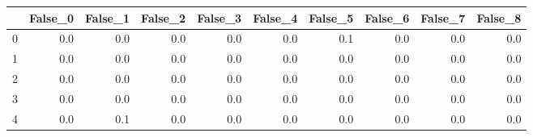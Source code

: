 \begin{tabular}{lrrrrrrrrr}
\toprule
{} &  False\_0 &  False\_1 &  False\_2 &  False\_3 &  False\_4 &  False\_5 &  False\_6 &  False\_7 &  False\_8 \\ \hline
\midrule
0 &      0.0 &      0.0 &      0.0 &      0.0 &      0.0 &      0.1 &      0.0 &      0.0 &      0.0 \\ \hline
1 &      0.0 &      0.0 &      0.0 &      0.0 &      0.0 &      0.0 &      0.0 &      0.0 &      0.0 \\ \hline
2 &      0.0 &      0.0 &      0.0 &      0.0 &      0.0 &      0.0 &      0.0 &      0.0 &      0.0 \\ \hline
3 &      0.0 &      0.0 &      0.0 &      0.0 &      0.0 &      0.0 &      0.0 &      0.0 &      0.0 \\ \hline
4 &      0.0 &      0.1 &      0.0 &      0.0 &      0.0 &      0.0 &      0.0 &      0.0 &      0.0 \\ \hline
\bottomrule
\end{tabular}
